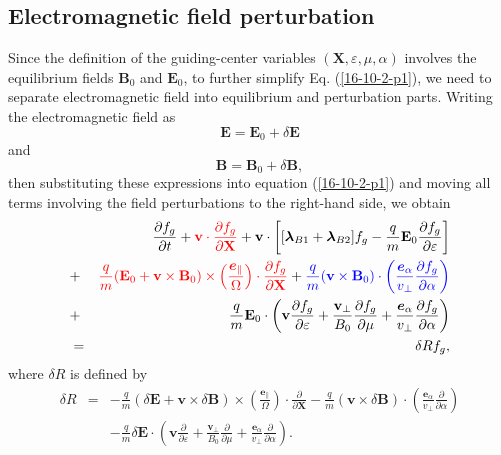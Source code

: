 \documentclass{article}
\newcommand{\tmcolor}[2]{{\color{#1}{#2}}}
\newcommand{\tmmathbf}[1]{\ensuremath{\boldsymbol{#1}}}
\begin{document}
\subsection{Electromagnetic field perturbation}

Since the definition of the guiding-center variables $(\mathbf{X},
\varepsilon, \mu, \alpha)$ involves the equilibrium fields $\mathbf{B}_0$ and
$\mathbf{E}_0$, to further simplify Eq. (\ref{16-10-2-p1}), we need to
separate electromagnetic field into equilibrium and perturbation parts.
Writing the electromagnetic field as
\begin{equation}
  \label{16-10-27-1} \mathbf{E}=\mathbf{E}_0 + \delta \mathbf{E}
\end{equation}
and
\begin{equation}
  \label{16-10-27-2} \mathbf{B}=\mathbf{B}_0 + \delta \mathbf{B},
\end{equation}
then substituting these expressions into equation (\ref{16-10-2-p1}) and
moving all terms involving the field perturbations to the right-hand side, we
obtain
\begin{eqnarray}
  &  & \frac{\partial f_g}{\partial t} + \tmcolor{red}{\mathbf{v} \cdot
  \frac{\partial f_g}{\partial \mathbf{X}}} +\mathbf{v} \cdot \left[
  [\tmmathbf{\lambda}_{B 1} +\tmmathbf{\lambda}_{B 2}] f_g - \frac{q}{m}
  \mathbf{E}_0 \frac{\partial f_g}{\partial \varepsilon} \right] \nonumber\\
  & + & \tmcolor{red}{\frac{q}{m} (\mathbf{E}_0 +\mathbf{v} \times
  \mathbf{B}_0) \times \left( \frac{\tmmathbf{e}_{\parallel}}{\Omega}  \right)
  \cdot \frac{\partial f_g}{\partial \mathbf{X}}} + \tmcolor{blue}{\frac{q}{m}
  (\mathbf{v} \times \mathbf{B}_0) \cdot \left(
  \frac{\tmmathbf{e}_{\alpha}}{v_{\perp}}  \frac{\partial f_g}{\partial
  \alpha} \right)} \nonumber\\
  & + & \frac{q}{m} \mathbf{E}_0 \cdot \left( \mathbf{v} \frac{\partial
  f_g}{\partial \varepsilon} + \frac{\mathbf{v}_{\perp}}{B_0}  \frac{\partial
  f_g}{\partial \mu} + \frac{\tmmathbf{e}_{\alpha}}{v_{\perp}}  \frac{\partial
  f_g}{\partial \alpha} \right) \nonumber\\
  & = & \delta R f_g,  \label{16-10-2-p2}
\end{eqnarray}
where $\delta R$ is defined by
\begin{eqnarray}
  \delta R & = & - \frac{q}{m} (\delta \mathbf{E}+\mathbf{v} \times \delta
  \mathbf{B}) \times \left( \frac{\tmmathbf{e}_{\parallel}}{\Omega}  \right)
  \cdot \frac{\partial}{\partial \mathbf{X}} - \frac{q}{m} (\mathbf{v} \times
  \delta \mathbf{B}) \cdot \left( \frac{\tmmathbf{e}_{\alpha}}{v_{\perp}} 
  \frac{\partial}{\partial \alpha} \right) \nonumber\\
  &  & - \frac{q}{m} \delta \mathbf{E} \cdot \left( \mathbf{v}
  \frac{\partial}{\partial \varepsilon} + \frac{\mathbf{v}_{\perp}}{B_0} 
  \frac{\partial}{\partial \mu} + \frac{\tmmathbf{e}_{\alpha}}{v_{\perp}} 
  \frac{\partial}{\partial \alpha} \right) .  \label{16-10-6-1}
\end{eqnarray}
\end{document}
